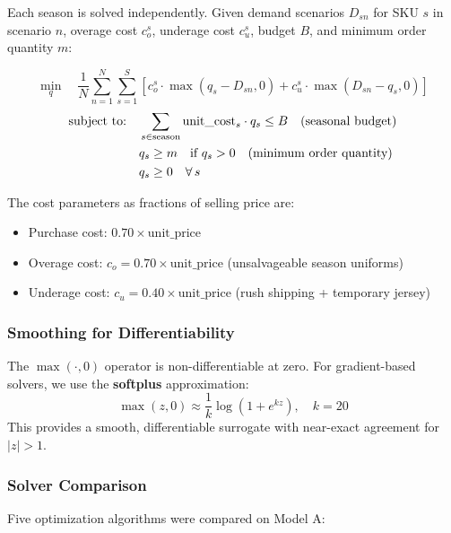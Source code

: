\documentclass[11pt, letterpaper]{article}
\begin{document}
Each season is solved independently. Given demand scenarios $D_{sn}$ for SKU $s$ in scenario $n$, overage cost $c_o^s$, underage cost $c_u^s$, budget $B$, and minimum order quantity $m$:

\begin{equation}
\min_{q} \quad \frac{1}{N} \sum_{n=1}^{N} \sum_{s=1}^{S} \left[ c_o^s \cdot \max(q_s - D_{sn}, 0) + c_u^s \cdot \max(D_{sn} - q_s, 0) \right]
\label{eq:model-a}
\end{equation}
\vspace{-8pt}
\begin{align}
\text{subject to:} \quad & \sum_{s \in \text{season}} \text{unit\_cost}_s \cdot q_s \leq B \quad \text{(seasonal budget)} \notag \\
& q_s \geq m \quad \text{if } q_s > 0 \quad \text{(minimum order quantity)} \notag \\
& q_s \geq 0 \quad \forall \, s \notag
\end{align}

The cost parameters as fractions of selling price are:
\begin{itemize}[nosep]
    \item Purchase cost: $0.70 \times \text{unit\_price}$
    \item Overage cost: $c_o = 0.70 \times \text{unit\_price}$ (unsalvageable season uniforms)
    \item Underage cost: $c_u = 0.40 \times \text{unit\_price}$ (rush shipping + temporary jersey)
\end{itemize}

\subsubsection{Smoothing for Differentiability}

The $\max(\cdot, 0)$ operator is non-differentiable at zero. For gradient-based solvers, we use the \textbf{softplus} approximation:
\[
\max(z, 0) \approx \frac{1}{k} \log(1 + e^{kz}), \quad k = 20
\]
This provides a smooth, differentiable surrogate with near-exact agreement for $|z| > 1$.

\subsubsection{Solver Comparison}

Five optimization algorithms were compared on Model A:
\end{document}
